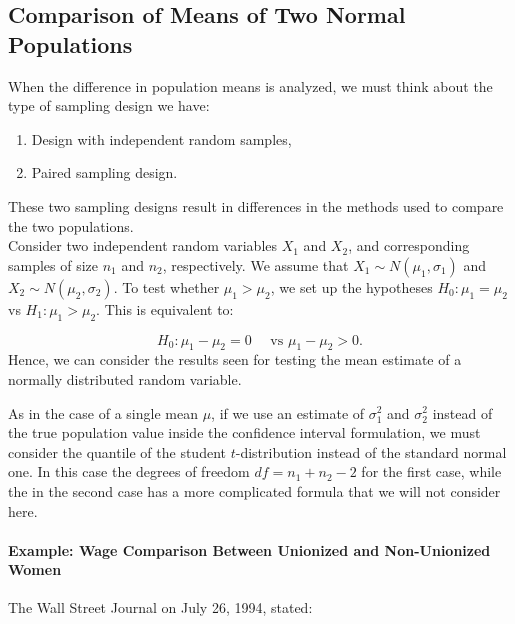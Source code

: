 \documentclass[
]{article}
\providecommand{\tightlist}{%
  \setlength{\itemsep}{0pt}\setlength{\parskip}{0pt}}
\begin{document}
\hypertarget{comparison-of-means-of-two-normal-populations}{%
\subsection{Comparison of Means of Two Normal
Populations}\label{comparison-of-means-of-two-normal-populations}}

When the difference in population means is analyzed, we must think about
the type of sampling design we have:

\begin{enumerate}
\def\labelenumi{(\roman{enumi})}
\tightlist
\item
  Design with independent random samples,
\item
  Paired sampling design.
\end{enumerate}

These two sampling designs result in differences in the methods used to
compare the two populations.\\
Consider two independent random variables \(X_1\) and \(X_2\), and
corresponding samples of size \(n_1\) and \(n_2\), respectively. We
assume that \(X_1\sim N(\mu_1,\sigma_1)\) and
\(X_2\sim N(\mu_2,\sigma_2)\). To test whether \(\mu_1 > \mu_2\), we set
up the hypotheses \(H_0: \mu_1 = \mu_2\) vs \(H_1: \mu_1 > \mu_2\). This
is equivalent to:

\[H_0: \mu_1 - \mu_2 = 0 \quad \mbox{ vs } \mu_1 - \mu_2 > 0.\] Hence,
we can consider the results seen for testing the mean estimate of a
normally distributed random variable.

As in the case of a single mean \(\mu\), if we use an estimate of
\(\sigma^2_1\) and \(\sigma^2_2\) instead of the true population value
inside the confidence interval formulation, we must consider the
quantile of the student \(t\)-distribution instead of the standard
normal one. In this case the degrees of freedom \(df = n_1 + n_2 -2\)
for the first case, while the in the second case has a more complicated
formula that we will not consider here.

\hypertarget{example-wage-comparison-between-unionized-and-non-unionized-women}{%
\paragraph{Example: Wage Comparison Between Unionized and Non-Unionized
Women}\label{example-wage-comparison-between-unionized-and-non-unionized-women}}

The Wall Street Journal on July 26, 1994, stated:
\end{document}
